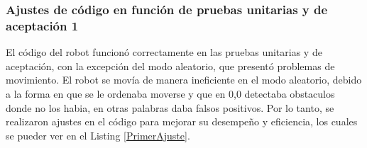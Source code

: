\subsubsection{Ajustes de c\'odigo en funci\'on de pruebas unitarias y de aceptaci\'on 1}
\label{subsub:Ajustes de c\'odigo en funci\'on de pruebas unitarias y de aceptaci\'on}
    El c\'odigo del robot funcion\'o correctamente en las pruebas unitarias y de aceptaci\'on, 
    con la excepci\'on del modo aleatorio, que present\'o problemas de movimiento.
    El robot se mov\'ia de manera ineficiente en el modo aleatorio, debido a la forma en 
    que se le ordenaba moverse y que en 0,0 detectaba obstaculos donde no los habia, en otras palabras daba 
    falsos positivos. Por lo tanto, se realizaron ajustes en el c\'odigo para 
    mejorar su desempe\~no y eficiencia, los cuales se pueder ver en el Listing \ref{PrimerAjuste}.
